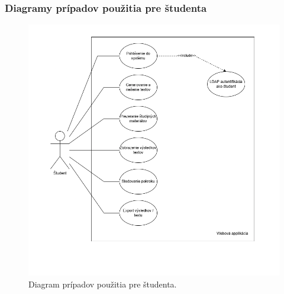 \subsubsection{Diagramy prípadov použitia pre študenta}
\begin{figure}[H]
  \centering
  \includegraphics[width=16cm]{img/diagram_student.png}
  \caption{Diagram prípadov použitia pre študenta.}
  \label{studentdiagram}
\end{figure}



